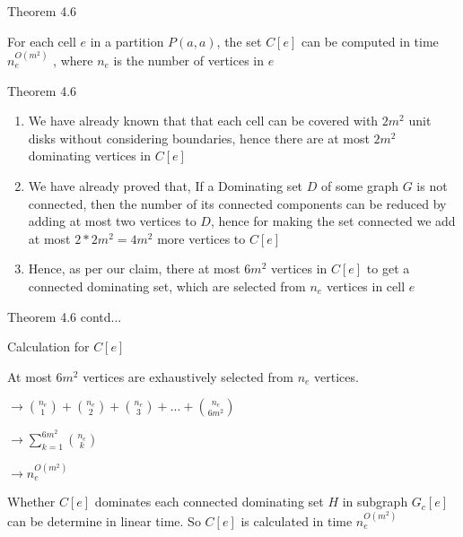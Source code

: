 \documentclass{beamer}
\begin{document}
\begin{frame}{}

\begin{block}{Theorem 4.6}

    For each cell $e$ in a partition $P(a, a)$, the set $C[e]$ can be computed in time $n _e ^ {O(m^2)}$  , where $n_e$ is the number of vertices in $e$

\end{block}

\end{frame}

\begin{frame}{Theorem 4.6}

    \begin{enumerate}

    \item We have already known that that each cell can be covered with $ 2m^2 $ unit disks without considering boundaries, hence there are at most $ 2m^2 $ dominating vertices in $C[e]$

    \item We have already proved that, If a Dominating set $D$ of some graph $G$ is not connected, then the number of its connected components can be reduced by adding at most two vertices to $D$, hence for making the set connected we add at most $ 2 * 2m^2 = 4m^2 $ more vertices to $C[e]$

    \item Hence, as per our claim, there at most $ 6m^2 $ vertices in $C[e]$ to get a connected dominating set, which are selected from $n_e$ vertices in cell $e$

    
\end{enumerate}

\end{frame}

\begin{frame}{Theorem 4.6 contd...}

    
    \begin{exampleblock}{Calculation for $C[e]$}

    At most $ 6m^2 $ vertices are exhaustively selected from $n_e$ vertices.

    \vspace{5mm}
    
    $ \xrightarrow{} \binom{n_e}{1} + \binom{n_e}{2} + \binom{n_e}{3} + ... + \binom{n_e}{6m^2} $

    \vspace{5mm}

    $\xrightarrow{} \displaystyle \sum_{k=1}^{6m^2} \binom{n_e}{k}$

    \vspace{5mm}

    $\xrightarrow{} n _e ^ {O(m^2)}$

    \vspace{5mm}

    Whether $ C[e] $ dominates each connected dominating set $H$ in subgraph $G_c[e]$ can be determine in linear time. So $C[e]$ is calculated in time $n _e ^ {O(m^2)}$

    \end{exampleblock}


\end{frame}
\end{document}
